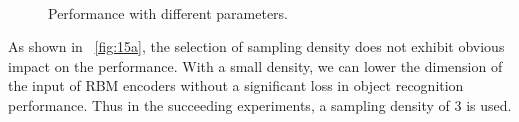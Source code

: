 \documentclass[10pt]{article}
\begin{document}
\begin{figure}
\centering
  \\
\caption{Performance with different parameters.}
\label{fig:15}
\end{figure}

As shown in \figurename~\ref{fig:15a},
the selection of sampling density does not exhibit obvious impact on the performance.
With a small density, we can lower the dimension of the input of RBM encoders
without a significant loss in object recognition performance.
Thus in the succeeding experiments, a sampling density of $3$ is used. 
\end{document}
